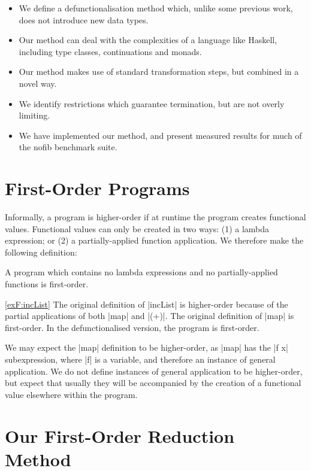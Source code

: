 \begin{itemize}
\item We define a defunctionalisation method which, unlike some previous work, does not introduce new data types.
\item Our method can deal with the complexities of a language like Haskell, including type classes, continuations and monads.
\item Our method makes use of standard transformation steps, but combined in a novel way.
\item We identify restrictions which guarantee termination, but are not overly limiting.
\item We have implemented our method, and present measured results for much of the nofib benchmark suite.
\end{itemize}

\section{First-Order Programs}
\label{secF:first_order}

Informally, a program is higher-order if at runtime the program creates functional values. Functional values can only be created in two ways: (1) a lambda expression; or (2) a partially-applied function application. We therefore make the following definition:

\begin{definition}
A program which contains no lambda expressions and no partially-applied functions is first-order.
\end{definition}

\begin{examplerevisit}{\ref{exF:incList}}
The original definition of |incList| is higher-order because of the partial applications of both |map| and |(+)|. The original definition of |map| is first-order. In the defunctionalised version, the program is first-order.
\end{examplerevisit}

We may expect the |map| definition to be higher-order, as |map| has the |f x| subexpression, where |f| is a variable, and therefore an instance of general application. We do not define instances of general application to be higher-order, but expect that usually they will be accompanied by the creation of a functional value elsewhere within the program.

\section{Our First-Order Reduction Method}
\label{secF:overview}

